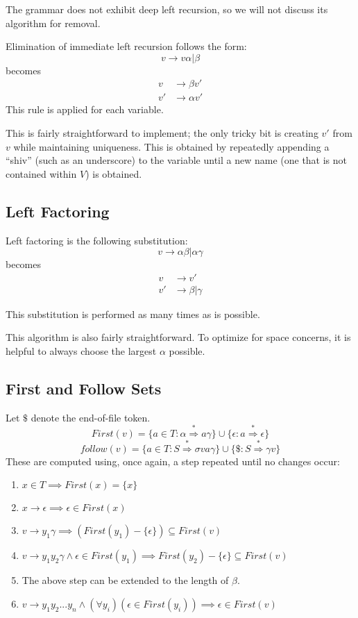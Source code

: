 \documentclass[titlepage]{article}
\newcommand{\deriv}{\overset{*}{\Rightarrow}}
\newcommand{\ep}{\epsilon}
\begin{document}
		The grammar does not exhibit deep left recursion, so we will not discuss its algorithm for removal.

		Elimination of immediate left recursion follows the form:
			\[ v \rightarrow v\alpha | \beta \]
		becomes
			\begin{align}
				v  &\rightarrow \beta v' \\
				v' &\rightarrow \alpha v'
			\end{align}
		This rule is applied for each variable.

		This is fairly straightforward to implement; the only tricky bit is creating $v'$ from $v$ while maintaining uniqueness. This is obtained by repeatedly appending a ``shiv'' (such as an underscore) to the variable until a new name (one that is not contained within $V$) is obtained.
		
		\subsection{Left Factoring}
		Left factoring is the following substitution:
			\[ v \rightarrow \alpha\beta | \alpha\gamma \]
		becomes
			\begin{align*}
				v  &\rightarrow v' \\
				v' &\rightarrow \beta | \gamma
			\end{align*}

		This substitution is performed as many times as is possible.

		This algorithm is also fairly straightforward. To optimize for space concerns, it is helpful to always choose the largest $\alpha$ possible.
		
		\subsection{First and Follow Sets}
		Let $\$$ denote the end-of-file token.
			\[ First(v) = \{a \in T: \alpha \deriv a\gamma\} \cup \{\ep : a \deriv \ep\} \]
			\[ follow(v) = \{a \in T: S \deriv \sigma v a \gamma\} \cup \{\$: S \deriv \gamma v\} \]
		These are computed using, once again, a step repeated until no changes occur:
		\begin{enumerate}
			\item $x \in T \implies First(x) = \{x\}$
			\item $x \rightarrow \ep \implies \ep \in First(x)$
			\item $v \rightarrow y_1\gamma \implies (First(y_1) - \{\ep\}) \subseteq First(v)$
			\item $v \rightarrow y_1y_2\gamma \land \ep \in First(y_1) \implies First(y_2)-\{\ep\} \subseteq First(v)$
			\item The above step can be extended to the length of $\beta$.
			\item $v \rightarrow y_1y_2...y_n \land (\forall y_i)(\ep \in First(y_i)) \implies \ep \in First(v)$
		\end{enumerate}
\end{document}
